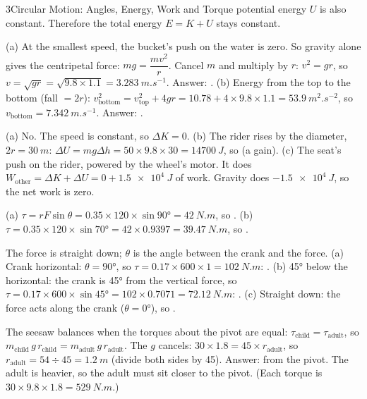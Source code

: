 \begin{chapteranswers}{3}{Circular Motion: Angles, Energy, Work and Torque}
        potential energy $U$ is also constant. Therefore the total energy $E = K + U$ stays constant.
  \item (a) At the smallest speed, the bucket's push on the water is zero. So gravity alone gives
        the centripetal force: $mg = \dfrac{mv^2}{r}$. Cancel $m$ and multiply by $r$: $v^2 = gr$,
        so $v = \sqrt{gr} = \sqrt{9.8 \times 1.1} = \qty{3.283}{m.s^{-1}}$.
        Answer: .
        (b) Energy from the top to the bottom (fall $= 2r$):
        $v_\mathrm{bottom}^2 = v_\mathrm{top}^2 + 4gr = 10.78 + 4 \times 9.8 \times 1.1 = \qty{53.9}{m^2.s^{-2}}$,
        so $v_\mathrm{bottom} = \qty{7.342}{m.s^{-1}}$. Answer: .
  \item (a) No. The speed is constant, so $\Delta K = 0$.
        (b) The rider rises by the diameter, $2r = \qty{30}{m}$:
        $\Delta U = mg\Delta h = 50 \times 9.8 \times 30 = \qty{14700}{J}$, so
         (a gain).
        (c) The seat's push on the rider, powered by the wheel's motor. It does
        $W_\mathrm{other} = \Delta K + \Delta U = 0 + \qty{1.5e4}{J}$ of work. Gravity does
        $-\qty{1.5e4}{J}$, so the net work is zero.
  \item (a) $\tau = rF\sin\theta = 0.35 \times 120 \times \sin\ang{90} = \qty{42}{N.m}$, so
        .
        (b) $\tau = 0.35 \times 120 \times \sin\ang{70} = 42 \times 0.9397 = \qty{39.47}{N.m}$, so
        .
  \item The force is straight down; $\theta$ is the angle between the crank and the force.
        (a) Crank horizontal: $\theta = \ang{90}$, so $\tau = 0.17 \times 600 \times 1 = \qty{102}{N.m}$:
        .
        (b) \ang{45} below the horizontal: the crank is \ang{45} from the vertical force, so
        $\tau = 0.17 \times 600 \times \sin\ang{45} = 102 \times 0.7071 = \qty{72.12}{N.m}$:
        .
        (c) Straight down: the force acts along the crank ($\theta = \ang{0}$), so
        .
  \item The seesaw balances when the torques about the pivot are equal:
        $\tau_\mathrm{child} = \tau_\mathrm{adult}$, so
        $m_\mathrm{child}\, g\, r_\mathrm{child} = m_\mathrm{adult}\, g\, r_\mathrm{adult}$.
        The $g$ cancels: $30 \times 1.8 = 45 \times r_\mathrm{adult}$, so
        $r_\mathrm{adult} = 54 \div 45 = \qty{1.2}{m}$ (divide both sides by 45).
        Answer:  from the pivot. The adult is heavier, so the adult must
        sit closer to the pivot. (Each torque is $30 \times 9.8 \times 1.8 = \qty{529}{N.m}$.)
\end{chapteranswers}
